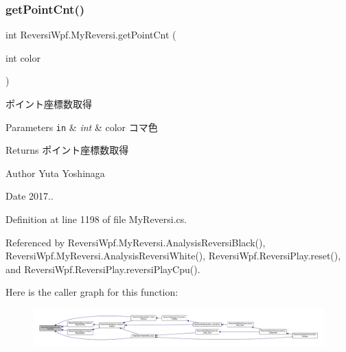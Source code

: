 \subsubsection{\texorpdfstring{get\+Point\+Cnt()}{getPointCnt()}}
{\footnotesize\ttfamily int Reversi\+Wpf.\+My\+Reversi.\+get\+Point\+Cnt (\begin{DoxyParamCaption}\item[{int}]{color }\end{DoxyParamCaption})}



ポイント座標数取得 


\begin{DoxyParams}[1]{Parameters}
\mbox{\tt in}  & {\em int} & color コマ色 \\
\hline
\end{DoxyParams}
\begin{DoxyReturn}{Returns}
ポイント座標数取得 
\end{DoxyReturn}
\begin{DoxyAuthor}{Author}
Yuta Yoshinaga 
\end{DoxyAuthor}
\begin{DoxyDate}{Date}
2017.. 
\end{DoxyDate}


Definition at line 1198 of file My\+Reversi.\+cs.



Referenced by Reversi\+Wpf.\+My\+Reversi.\+Analysis\+Reversi\+Black(), Reversi\+Wpf.\+My\+Reversi.\+Analysis\+Reversi\+White(), Reversi\+Wpf.\+Reversi\+Play.\+reset(), and Reversi\+Wpf.\+Reversi\+Play.\+reversi\+Play\+Cpu().

Here is the caller graph for this function\+:
\nopagebreak
\begin{figure}[H]
\begin{center}
\leavevmode
\includegraphics[width=350pt]{class_reversi_wpf_1_1_my_reversi_a86f08f7b19fe00b88ef7236bd784a451_icgraph}
\end{center}
\end{figure}
\mbox{\label{class_reversi_wpf_1_1_my_reversi_a7e4d94600afb1b9d512341b1692769e7}} 
